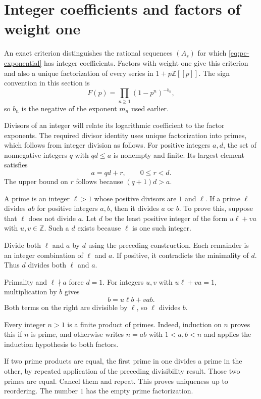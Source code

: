 \section{Integer coefficients and factors of weight one}

An exact criterion distinguishes the rational sequences $(A_s)$ for
which \eqref{eq:pc-exponential} has integer coefficients.
Factors with weight one give this criterion and also a unique
factorization of every series in $1+p\mathbb Z[[p]]$.
The sign convention in this section is
\[
 F(p)=\prod_{n\geq1}(1-p^n)^{-b_n},
\]
so $b_n$ is the negative of the exponent $m_n$ used earlier.

Divisors of an integer will relate its logarithmic coefficient to the
factor exponents. The required divisor identity uses unique factorization
into primes, which follows from integer division as follows.
For positive integers $a,d$, the set of nonnegative integers $q$ with
$qd\leq a$ is nonempty and finite. Its largest element satisfies
\[
 a=qd+r,\qquad 0\leq r<d.
\]
The upper bound on $r$ follows because $(q+1)d>a$.

A prime is an integer $\ell>1$ whose positive divisors are $1$ and $\ell$.
If a prime $\ell$ divides $ab$ for positive integers $a,b$, then it
divides $a$ or $b$. To prove this, suppose that $\ell$ does not divide $a$.
Let $d$ be the least positive integer of the form $u\ell+va$ with
$u,v\in\mathbb Z$. Such a $d$ exists because $\ell$ is one such integer.

Divide both $\ell$ and $a$ by $d$ using the preceding construction.
Each remainder is an integer combination of $\ell$ and $a$.
If positive, it contradicts the minimality of $d$.
Thus $d$ divides both $\ell$ and $a$.

Primality and $\ell\nmid a$ force $d=1$.
For integers $u,v$ with $u\ell+va=1$, multiplication by $b$ gives
\[
 b=u\ell b+vab.
\]
Both terms on the right are divisible by $\ell$, so $\ell$ divides $b$.

Every integer $n>1$ is a finite product of primes. Indeed, induction on
$n$ proves this if $n$ is prime, and otherwise writes $n=ab$ with
$1<a,b<n$ and applies the induction hypothesis to both factors.

If two prime products are equal, the first prime in one divides a prime
in the other, by repeated application of the preceding divisibility result.
Those two primes are equal. Cancel them and repeat.
This proves uniqueness up to reordering. The number $1$ has the empty
prime factorization.

